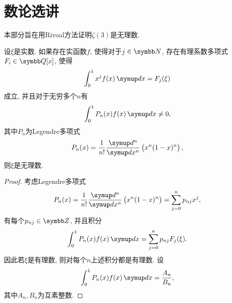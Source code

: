 \section{数论选讲}

本部分旨在用Rivoal方法证明$\zeta(3)$是无理数.

\begin{theorem}
    设$\xi$是实数. 如果存在实函数$f$, 使得对于$j\in \BN$, 存在有理系数多项式$F_i\in \BQ[x]$, 使得
    \begin{equation}
        \int_0^1 x^jf(x)\diff x=F_j(\xi)
    \end{equation}
    成立, 并且对于无穷多个$n$有
    \begin{equation}
        \int_0^1 P_n(x)f(x)\diff x\neq 0,
    \end{equation}
    其中$P_n$为Legendre多项式
    \begin{equation}
        P_n(x)=\frac{1}{n!}\frac{\diff^n}{\diff x^n}\lr(){x^n(1-x)^n},
    \end{equation}
    则$\xi$是无理数.
\end{theorem}

\begin{proof}
    考虑Legendre多项式
    \begin{equation}
        P_n(x)=\frac{1}{n!}\frac{\diff^n}{\diff x^n}\lr(){x^n(1-x)^n} = \sum_{j=0}^n p_{nj}x^j,
    \end{equation}
    有每个$p_{nj}\in\BZ$, 并且积分
    \begin{equation}
        \int_0^1 P_n(x)f(x)\diff x=\sum_{j=0}^np_{nj}F_j(\xi).
    \end{equation}
    因此若$\xi$是有理数, 则对每个$n$上述积分都是有理数. 设
    \begin{equation}
        \int_0^1 P_n(x)f(x)\diff x = \frac{A_n}{B_n},
    \end{equation}
    其中$A_n, B_n$为互素整数.
\end{proof}
